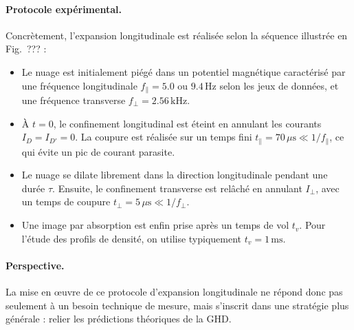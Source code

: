 \paragraph{Protocole expérimental.}
Concrètement, l’expansion longitudinale est réalisée selon la séquence illustrée en Fig.~??? :
\begin{itemize}[label = $\bullet$]
  \item Le nuage est initialement piégé dans un potentiel magnétique caractérisé par une fréquence longitudinale $f_{\parallel} = 5.0$ ou $9.4\,\mathrm{Hz}$ selon les jeux de données, et une fréquence transverse $f_{\perp} = 2.56\,\mathrm{kHz}$.
  \item À $t=0$, le confinement longitudinal est éteint en annulant les courants $I_D=I_{D'}=0$. La coupure est réalisée sur un temps fini $t_{\parallel} = 70\,\mu\mathrm{s} \ll 1/f_{\parallel}$, ce qui évite un pic de courant parasite.%
  \item Le nuage se dilate librement dans la direction longitudinale pendant une durée $\tau$. Ensuite, le confinement transverse est relâché en annulant $I_{\perp}$, avec un temps de coupure $t_{\perp} = 5\,\mu\mathrm{s} \ll 1/f_{\perp}$.
  \item Une image par absorption est enfin prise après un temps de vol $t_v$. Pour l’étude des profils de densité, on utilise typiquement $t_v = 1\,\mathrm{ms}$.
\end{itemize}


\paragraph{Perspective.}
La mise en œuvre de ce protocole d’expansion longitudinale ne répond donc pas seulement à un besoin technique de mesure, mais s’inscrit dans une stratégie plus générale : relier les prédictions théoriques de la \gls{GHD}.%

